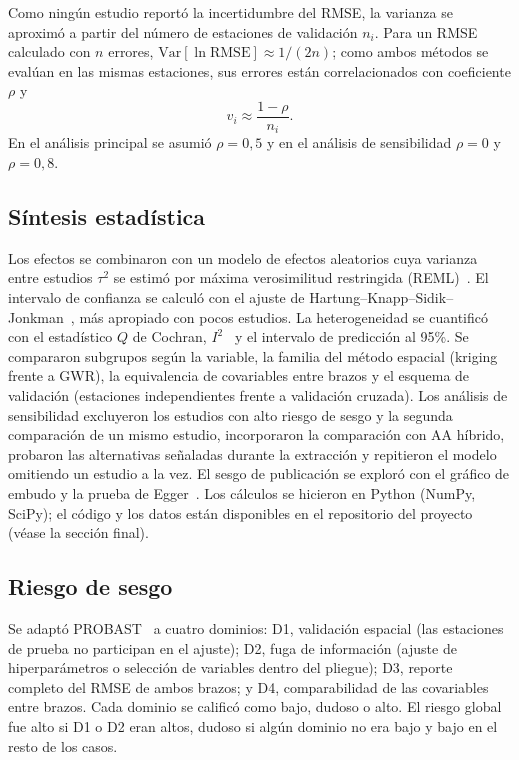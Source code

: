 \documentclass[conference]{IEEEtran}
\begin{document}
Como ningún estudio reportó la incertidumbre del RMSE, la varianza se aproximó a partir del número de estaciones de validación $n_i$. Para un RMSE calculado con $n$ errores, $\mathrm{Var}[\ln \mathrm{RMSE}] \approx 1/(2n)$; como ambos métodos se evalúan en las mismas estaciones, sus errores están correlacionados con coeficiente $\rho$ y
\begin{equation}
v_i \approx \frac{1-\rho}{n_i}.
\label{eq:varianza}
\end{equation}
En el análisis principal se asumió $\rho=0{,}5$ y en el análisis de sensibilidad $\rho=0$ y $\rho=0{,}8$.

\subsection{Síntesis estadística}
Los efectos se combinaron con un modelo de efectos aleatorios cuya varianza entre estudios $\tau^2$ se estimó por máxima verosimilitud restringida (REML)~\cite{viechtbauer2005}. El intervalo de confianza se calculó con el ajuste de Hartung--Knapp--Sidik--Jonkman~\cite{hartung2001}, más apropiado con pocos estudios. La heterogeneidad se cuantificó con el estadístico $Q$ de Cochran, $I^2$~\cite{higgins2002} y el intervalo de predicción al 95\%. Se compararon subgrupos según la variable, la familia del método espacial (kriging frente a GWR), la equivalencia de covariables entre brazos y el esquema de validación (estaciones independientes frente a validación cruzada). Los análisis de sensibilidad excluyeron los estudios con alto riesgo de sesgo y la segunda comparación de un mismo estudio, incorporaron la comparación con AA híbrido, probaron las alternativas señaladas durante la extracción y repitieron el modelo omitiendo un estudio a la vez. El sesgo de publicación se exploró con el gráfico de embudo y la prueba de Egger~\cite{egger1997}. Los cálculos se hicieron en Python (NumPy, SciPy); el código y los datos están disponibles en el repositorio del proyecto (véase la sección final).

\subsection{Riesgo de sesgo}
Se adaptó PROBAST~\cite{wolff2019} a cuatro dominios: D1, validación espacial (las estaciones de prueba no participan en el ajuste); D2, fuga de información (ajuste de hiperparámetros o selección de variables dentro del pliegue); D3, reporte completo del RMSE de ambos brazos; y D4, comparabilidad de las covariables entre brazos. Cada dominio se calificó como bajo, dudoso o alto. El riesgo global fue alto si D1 o D2 eran altos, dudoso si algún dominio no era bajo y bajo en el resto de los casos.
\end{document}
